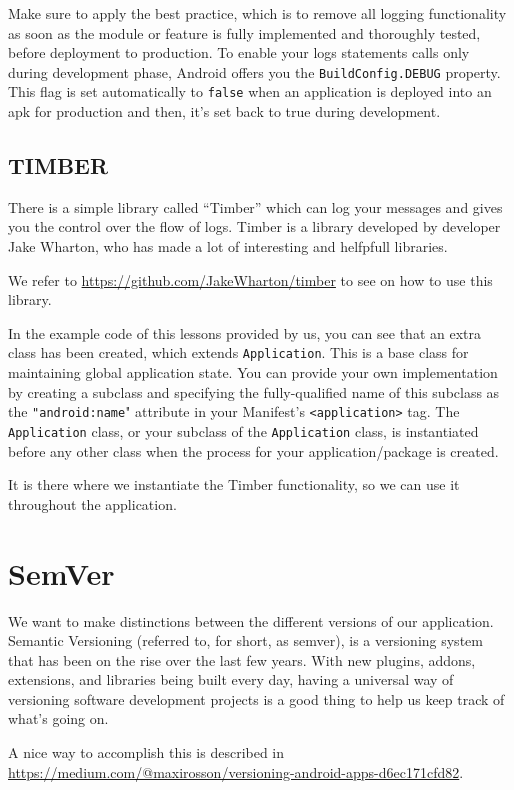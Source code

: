 Make sure to apply the best practice, which is to remove all logging functionality as soon as the module or feature is fully implemented and thoroughly tested, before deployment to production. To enable your logs statements calls only during development phase, Android offers you the \lstinline|BuildConfig.DEBUG| property. This flag is set  automatically to \lstinline|false| when an application is deployed into an \gls{apk} for production and then, it’s set back to true during development.

\subsection{TIMBER}
There is a simple library called “Timber” which can log your messages and gives you the control over the flow of logs. Timber is a  library developed by  developer Jake Wharton, who has made a lot of interesting and helfpfull libraries.

We refer to \url{https://github.com/JakeWharton/timber} to see on how to use this library. 

In the example code of this lessons provided by us, you can see that an extra class has been created, which extends \lstinline|Application|. This  is a base class for maintaining global application state. You can provide your own implementation by creating a subclass and specifying the fully-qualified name of this subclass as the \lstinline|"android:name|" attribute in your Manifest's \lstinline|<application>| tag. The \lstinline|Application| class, or your subclass of the \lstinline|Application| class, is instantiated before any other class when the process for your application/package is created. 

It is there where we instantiate the Timber functionality, so we can use it throughout the application. 

\section{SemVer}
We want to make distinctions between the different versions of our application. Semantic Versioning (referred to, for short, as \gls{semver}), is a versioning system that has been on the rise over the last few years. With new plugins, addons, extensions, and libraries being built every day, having a universal way of versioning software development projects is a good thing to help us keep track of what’s going on.

A nice way to accomplish this is described in \url{https://medium.com/@maxirosson/versioning-android-apps-d6ec171cfd82}.

